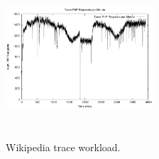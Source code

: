 



\begin{figure}
\begin{center}
\includegraphics[width=0.49\textwidth, height=6cm]{./images/traceWorkload2011}
\end{center}
\vspace{-5mm}
\caption{Wikipedia trace workload.}
\label{workload}
\end{figure}





